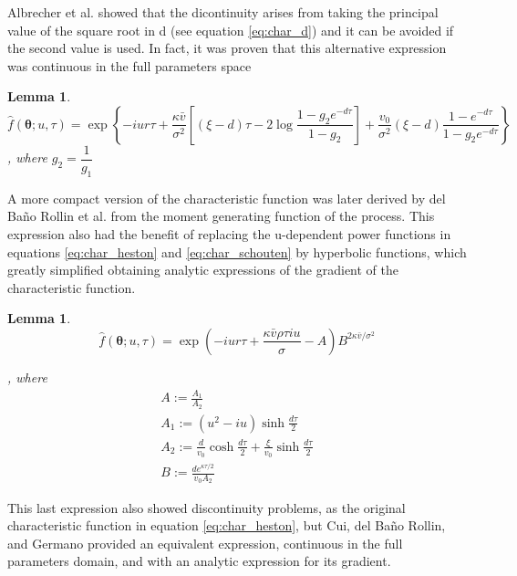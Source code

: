 \documentclass[12,twoside]{mammeTFM}
\newtheorem{lem}[thm]{Lemma}
\theoremstyle{definition}
\theoremstyle{remark}
\begin{document}
Albrecher et al. \cite{Albrecher2007} showed that the dicontinuity arises from taking the principal value of the square root in d (see equation \ref{eq:char_d}) and it can be avoided if the second value is used. In fact, it was proven that this alternative expression was continuous in the full parameters space \cite{sch04}

\begin{lem}
\begin{equation} \label{eq:char_schouten}
\hat{f}(\boldsymbol{\theta} ; u, \tau)=\exp \left\{-i u r \tau
+\frac{\kappa \bar{v}}{\sigma^{2}}\left[(\xi-d) \tau-2 \log \frac{1-g_{2} e^{-d \tau}}{1-g_{2}}\right]+\frac{v_{0}}{\sigma^{2}}(\xi-d) \frac{1-e^{-d \tau}}{1-g_{2} e^{-d \tau}}\right\} 
\end{equation}
, where $g_2 = \dfrac{1}{g_1}$
\end{lem}

A more compact version of the characteristic function was later derived by del Ba\~no Rollin et al. \cite{rol10} from the moment generating function of the process. This expression also had the benefit of replacing the u-dependent power functions in equations \ref{eq:char_heston} and \ref{eq:char_schouten} by hyperbolic functions, which greatly simplified obtaining analytic expressions of the gradient of the characteristic function.

\begin{lem}
\begin{equation} \label{eq:char_del_bano}
\hat{f}(\boldsymbol{\theta} ; u, \tau)=\exp \left(-i u r \tau + \frac{\kappa \bar{v} \rho \tau i u}{\sigma}-A\right) B^{2 \kappa \bar{v} / \sigma^{2}}
\end{equation}

, where
\begin{equation}\begin{array}{l}
A:=\frac{A_{1}}{A_{2}} \\
A_{1}:=\left(u^{2} - i u\right) \sinh \frac{d \tau}{2} \\
A_{2}:=\frac{d}{v_{0}} \cosh \frac{d \tau}{2}+\frac{\xi}{v_{0}} \sinh \frac{d \tau}{2} \\
B:=\frac{d e^{\kappa \tau / 2}}{v_{0} A_{2}}
\end{array}\end{equation}
\end{lem}

This last expression also showed discontinuity problems, as the original characteristic function in equation \ref{eq:char_heston}, but Cui, del Ba\~no Rollin, and Germano provided an equivalent expression, continuous in the full parameters domain, and with an analytic expression for its gradient.
\end{document}
